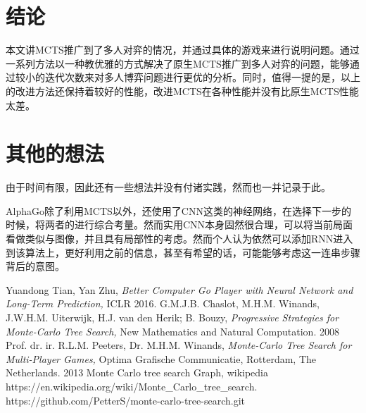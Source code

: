 \documentclass[9pt,twocolumn,twoside]{osajnl}
\begin{document}
\section{结论}
	本文讲MCTS推广到了多人对弈的情况，并通过具体的游戏来进行说明问题。通过一系列方法以一种教优雅的方式解决了原生MCTS推广到多人对弈的问题，能够通过较小的迭代次数来对多人博弈问题进行更优的分析。同时，值得一提的是，以上的改进方法还保持着较好的性能，改进MCTS在各种性能并没有比原生MCTS性能太差。

\section{其他的想法}
由于时间有限，因此还有一些想法并没有付诸实践，然而也一并记录于此。

AlphaGo除了利用MCTS以外，还使用了CNN这类的神经网络，在选择下一步的时候，将两者的进行综合考量。然而实用CNN本身固然很合理，可以将当前局面看做类似与图像，并且具有局部性的考虑。然而个人认为依然可以添加RNN进入到该算法上，更好利用之前的信息，甚至有希望的话，可能能够考虑这一连串步骤背后的意图。


\begin{thebibliography}{1}
Yuandong Tian, Yan Zhu, \emph{Better Computer Go Player with Neural Network and Long-Term Prediction,} ICLR 2016.
 G.M.J.B. Chaslot, M.H.M. Winands, J.W.H.M. Uiterwijk, H.J. van den Herik; B. Bouzy, \emph{Progressive Strategies for Monte-Carlo Tree Search, } New Mathematics and Natural Computation. 2008
Prof. dr. ir. R.L.M. Peeters, Dr. M.H.M. Winands, \emph{Monte-Carlo Tree Search for Multi-Player Games, } Optima Grafische Communicatie, Rotterdam, The Netherlands. 2013
 Monte Carlo tree search Graph, wikipedia https://en.wikipedia.org/wiki/Monte\_Carlo\_tree\_search.
 https://github.com/PetterS/monte-carlo-tree-search.git
\end{thebibliography}
\end{document}
